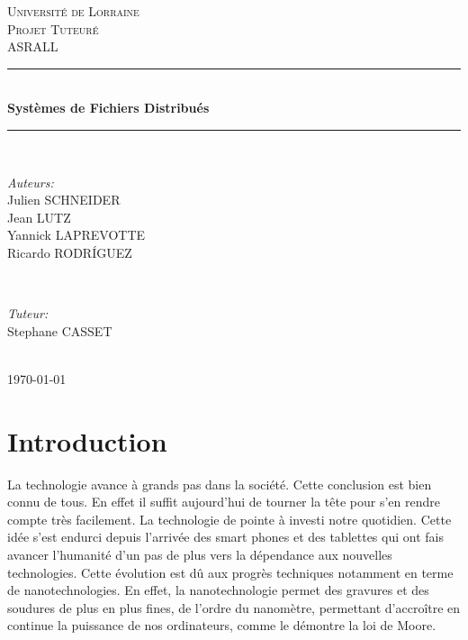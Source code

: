 \documentclass[12pt]{article}
\begin{document}
\begin{titlepage}
\newcommand{\HRule}{\rule{\linewidth}{0.5mm}}
\center 

\textsc{\LARGE Université de Lorraine}\\[1.5cm] 
\textsc{\Large Projet Tuteuré}\\[0.5cm]
\textsc{\large ASRALL}\\[0.5cm]

\HRule \\[0.4cm]
{ \huge \bfseries Systèmes de Fichiers Distribués}\\[0.4cm] 
\HRule \\[1.5cm]

\begin{minipage}{0.4\textwidth}
\begin{flushleft} \large
\emph{Auteurs:}\\
Julien \textsc{SCHNEIDER}\\
Jean \textsc{LUTZ}\\
Yannick \textsc{LAPREVOTTE}\\
Ricardo \textsc{RODRÍGUEZ}\\
\end{flushleft}
\end{minipage}
~
\begin{minipage}{0.4\textwidth}
\begin{flushright} \large
\emph{Tuteur:} \\
 Stephane \textsc{CASSET} 
\end{flushright}
\end{minipage}\\[4cm]

{\large \today}\\[3cm] 

\vfill 
\end{titlepage}


\tableofcontents 

\newpage 

\section{Introduction}

La technologie avance à grands pas dans la société. Cette conclusion est bien connu de tous. En effet il suffit aujourd'hui de tourner la tête pour s'en rendre compte très facilement. La technologie de pointe à investi notre quotidien. Cette idée s'est  endurci depuis l'arrivée des smart phones et des tablettes qui ont fais avancer l'humanité d'un pas de plus vers la dépendance aux nouvelles technologies. Cette évolution est dû aux progrès techniques notamment en terme de nanotechnologies. En effet, la nanotechnologie permet des gravures et des soudures de plus en plus fines, de l'ordre du nanomètre, permettant d’accroître en continue la puissance de nos ordinateurs, comme le démontre la loi de Moore.
\end{document}
